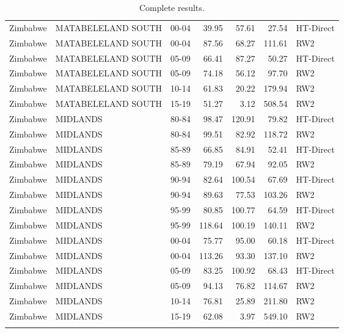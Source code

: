 \begin{longtable}{lllrrrl}
  Zimbabwe & MATABELELAND SOUTH & 00-04 & 39.95 & 57.61 & 27.54 & HT-Direct \\ 
  Zimbabwe & MATABELELAND SOUTH & 00-04 & 87.56 & 68.27 & 111.61 & RW2 \\ 
  Zimbabwe & MATABELELAND SOUTH & 05-09 & 66.41 & 87.27 & 50.27 & HT-Direct \\ 
  Zimbabwe & MATABELELAND SOUTH & 05-09 & 74.18 & 56.12 & 97.70 & RW2 \\ 
  Zimbabwe & MATABELELAND SOUTH & 10-14 & 61.83 & 20.22 & 179.94 & RW2 \\ 
  Zimbabwe & MATABELELAND SOUTH & 15-19 & 51.27 & 3.12 & 508.54 & RW2 \\ 
  Zimbabwe & MIDLANDS & 80-84 & 98.47 & 120.91 & 79.82 & HT-Direct \\ 
  Zimbabwe & MIDLANDS & 80-84 & 99.51 & 82.92 & 118.72 & RW2 \\ 
  Zimbabwe & MIDLANDS & 85-89 & 66.85 & 84.91 & 52.41 & HT-Direct \\ 
  Zimbabwe & MIDLANDS & 85-89 & 79.19 & 67.94 & 92.05 & RW2 \\ 
  Zimbabwe & MIDLANDS & 90-94 & 82.64 & 100.54 & 67.69 & HT-Direct \\ 
  Zimbabwe & MIDLANDS & 90-94 & 89.63 & 77.53 & 103.26 & RW2 \\ 
  Zimbabwe & MIDLANDS & 95-99 & 80.85 & 100.77 & 64.59 & HT-Direct \\ 
  Zimbabwe & MIDLANDS & 95-99 & 118.64 & 100.19 & 140.11 & RW2 \\ 
  Zimbabwe & MIDLANDS & 00-04 & 75.77 & 95.00 & 60.18 & HT-Direct \\ 
  Zimbabwe & MIDLANDS & 00-04 & 113.26 & 93.30 & 137.10 & RW2 \\ 
  Zimbabwe & MIDLANDS & 05-09 & 83.25 & 100.92 & 68.43 & HT-Direct \\ 
  Zimbabwe & MIDLANDS & 05-09 & 94.13 & 76.82 & 114.67 & RW2 \\ 
  Zimbabwe & MIDLANDS & 10-14 & 76.81 & 25.89 & 211.80 & RW2 \\ 
  Zimbabwe & MIDLANDS & 15-19 & 62.08 & 3.97 & 549.10 & RW2 \\ 
  \hline
\caption{Complete results.} 
\label{fulltable}
\end{longtable}
